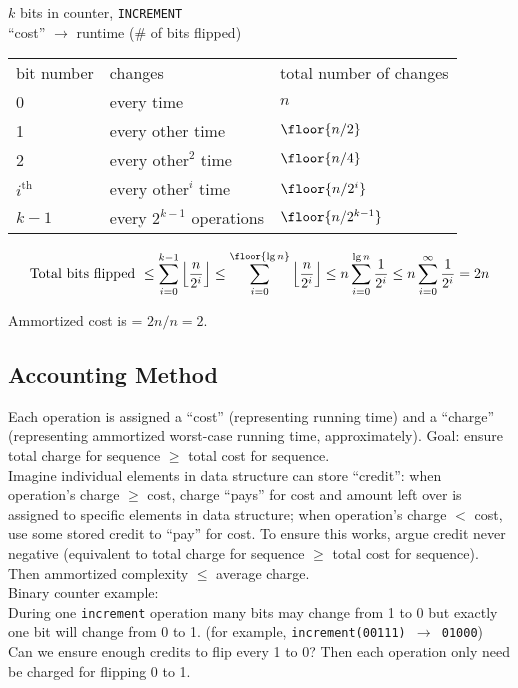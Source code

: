 \noindent $k$ bits in counter, \texttt{INCREMENT} \\
``cost'' $\rightarrow$ runtime (\# of bits flipped) \\

\begin{tabular}{l l l}
	bit number & changes & total number of changes \\
	0 & every time & $n$ \\
	1 & every other time & $\floor{n/2}$ \\
	2 & ${\textrm{every other}}^2$ time & $\floor{n/4}$ \\
	$i^{\textrm{th}}$ & ${\textrm{every other}}^i$ time & $\floor{n/2^i}$ \\
	$k-1$ & every $2^{k-1}$ operations & $\floor{n/2^{k-1}}$
\end{tabular}

$$ \textrm{Total bits flipped }
\leq \sum_{i=0}^{k-1} \left \lfloor \frac{n}{2^i} \right \rfloor
\leq \sum_{i=0}^{\floor{\lg n}} \left \lfloor \frac{n}{2^i} \right \rfloor \leq n \sum_{i=0}^{\lg n} \frac{1}{2^i}
\leq n \sum_{i=0}^{\infty} \frac{1}{2^i}
= 2n $$

\noindent Ammortized cost is = $2n / n = 2$. \\

\subsection*{Accounting Method}

\noindent Each operation is assigned a ``cost'' (representing running time) and a ``charge'' (representing ammortized worst-case running time, approximately). Goal: ensure total charge for sequence $\geq$ total cost for sequence. \\

\noindent Imagine individual elements in data structure can store ``credit'':
when operation's charge $\geq$ cost, charge ``pays'' for cost and amount left over is assigned to specific elements in data structure; when operation's charge $<$ cost, use some stored credit to ``pay'' for cost. To ensure this works, argue credit never negative (equivalent to total charge for sequence $\geq$ total cost for sequence). Then ammortized complexity $\leq$ average charge. \\

\noindent Binary counter example: \\
During one \texttt{increment} operation many bits may change from 1 to 0 but exactly one bit will change from 0 to 1. (for example, \texttt{increment(00111) $\rightarrow$ 01000}) Can we ensure enough credits to flip every 1 to 0? Then each operation only need be charged for flipping 0 to 1. \\

